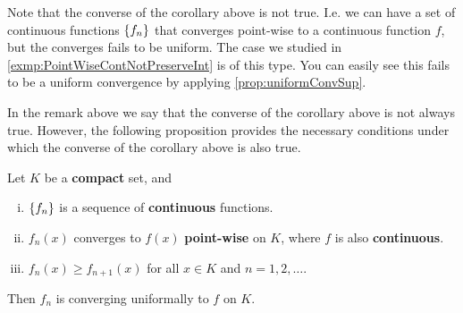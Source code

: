 \begin{remark}
	Note that the converse of the corollary above is not true. I.e. we can have a set of continuous functions $ \{f_n\} $ that converges point-wise to a continuous function $ f  $, but the converges fails to be uniform. The case we studied in \autoref{exmp:PointWiseContNotPreserveInt} is of this type. You can easily see this fails to be a uniform convergence by applying \autoref{prop:uniformConvSup}.
\end{remark}

In the remark above we say that the converse of the corollary above is not always true. However, the following proposition provides the necessary conditions under which the converse of the corollary above is also true. 


\begin{proposition}
	Let $ K $ be a \textbf{compact} set, and 
	\begin{enumerate}[(i),noitemsep]
		\item $ \{f_n\} $ is a sequence of \textbf{continuous} functions.
		\item $ f_n(x) $ converges to $ f(x) $ \textbf{ point-wise} on $ K $, where $ f $ is also \textbf{continuous}.
		\item $ f_n(x) \geq f_{n+1}(x) $ for all $ x\in K $ and $ n=1,2,\hdots. $
	\end{enumerate}
	Then $ f_n $ is converging uniformally to $ f $ on $  K $.
\end{proposition}

